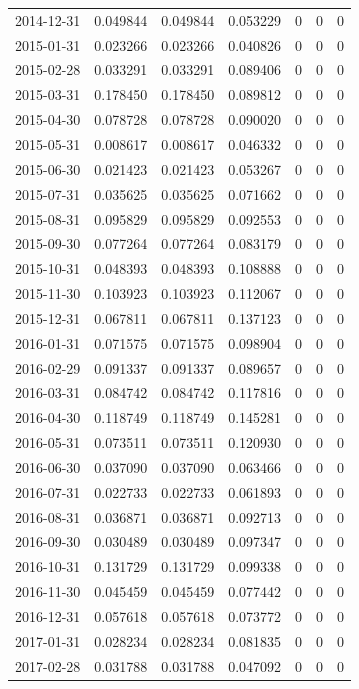 \documentclass[conference,onecolumn]{IEEEtran}
\begin{document}
\begin{longtable}{|c|c|c|c|c|c|c|}
2014-12-31 & 0.049844 & 0.049844 & 0.053229 & 0 & 0 & 0 \\
2015-01-31 & 0.023266 & 0.023266 & 0.040826 & 0 & 0 & 0 \\
2015-02-28 & 0.033291 & 0.033291 & 0.089406 & 0 & 0 & 0 \\
2015-03-31 & 0.178450 & 0.178450 & 0.089812 & 0 & 0 & 0 \\
2015-04-30 & 0.078728 & 0.078728 & 0.090020 & 0 & 0 & 0 \\
2015-05-31 & 0.008617 & 0.008617 & 0.046332 & 0 & 0 & 0 \\
2015-06-30 & 0.021423 & 0.021423 & 0.053267 & 0 & 0 & 0 \\
2015-07-31 & 0.035625 & 0.035625 & 0.071662 & 0 & 0 & 0 \\
2015-08-31 & 0.095829 & 0.095829 & 0.092553 & 0 & 0 & 0 \\
2015-09-30 & 0.077264 & 0.077264 & 0.083179 & 0 & 0 & 0 \\
2015-10-31 & 0.048393 & 0.048393 & 0.108888 & 0 & 0 & 0 \\
2015-11-30 & 0.103923 & 0.103923 & 0.112067 & 0 & 0 & 0 \\
2015-12-31 & 0.067811 & 0.067811 & 0.137123 & 0 & 0 & 0 \\
2016-01-31 & 0.071575 & 0.071575 & 0.098904 & 0 & 0 & 0 \\
2016-02-29 & 0.091337 & 0.091337 & 0.089657 & 0 & 0 & 0 \\
2016-03-31 & 0.084742 & 0.084742 & 0.117816 & 0 & 0 & 0 \\
2016-04-30 & 0.118749 & 0.118749 & 0.145281 & 0 & 0 & 0 \\
2016-05-31 & 0.073511 & 0.073511 & 0.120930 & 0 & 0 & 0 \\
2016-06-30 & 0.037090 & 0.037090 & 0.063466 & 0 & 0 & 0 \\
2016-07-31 & 0.022733 & 0.022733 & 0.061893 & 0 & 0 & 0 \\
2016-08-31 & 0.036871 & 0.036871 & 0.092713 & 0 & 0 & 0 \\
2016-09-30 & 0.030489 & 0.030489 & 0.097347 & 0 & 0 & 0 \\
2016-10-31 & 0.131729 & 0.131729 & 0.099338 & 0 & 0 & 0 \\
2016-11-30 & 0.045459 & 0.045459 & 0.077442 & 0 & 0 & 0 \\
2016-12-31 & 0.057618 & 0.057618 & 0.073772 & 0 & 0 & 0 \\
2017-01-31 & 0.028234 & 0.028234 & 0.081835 & 0 & 0 & 0 \\
2017-02-28 & 0.031788 & 0.031788 & 0.047092 & 0 & 0 & 0 \\

\end{longtable}
\end{document}
